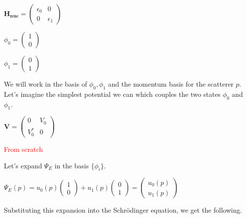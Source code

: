 \documentclass[12pt,letterpaper]{article}
\numberwithin{equation}{section}
\begin{document}
\begin{center}
$\boldsymbol{H_{nuc}} = 
\begin{pmatrix}
\epsilon_0 & 0 \\ 
0 & \epsilon_1
\end{pmatrix}$
\end{center}

\begin{center}
$\phi_0 = 
\begin{pmatrix}
1 \\ 0
\end{pmatrix}$
\end{center}

\begin{center}
$\phi_1 = 
\begin{pmatrix}
0 \\ 1
\end{pmatrix}$
\end{center}

\noindent We will work in the basis of ${\phi_0,\phi_1}$ and the momentum basis for the scatterer $p$. Let's imagine the simplest potential we can which couples the two states $\phi_0$ and $\phi_1$.

\begin{center}
$\boldsymbol{V} =
\begin{pmatrix}
0 & V_{0} \\ 
V_{0}^* & 0
\end{pmatrix}
$
\end{center}

\textcolor{red}{From scratch}

\noindent Let's expand $\Psi_E$ in the basis $\{\phi_i\}$.

\begin{center}
$\Psi_E(p) = u_0(p)\begin{pmatrix}
1 \\ 0
\end{pmatrix}
+ u_1(p)\begin{pmatrix}
0 \\ 1
\end{pmatrix}
=
\begin{pmatrix}
u_0(p) \\ u_1(p)
\end{pmatrix}$
\end{center}

\noindent Substituting this expansion into the Schrödinger equation, we get the following.
\end{document}

